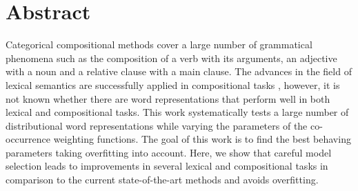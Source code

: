 \chapter*{Abstract}
\label{cha:abstract}

Categorical compositional methods \cite{DBLP:journals/corr/abs-1003-4394} cover a large number of grammatical phenomena such as the composition of a verb with its arguments, an adjective with a noun and a relative clause with a main clause. The advances in the field of lexical semantics \cite{mikolov2013efficient,baroni-dinu-kruszewski:2014:P14-1,TACL570} are successfully applied in compositional tasks \cite{milajevs-EtAl:2014:EMNLP2014}, however, it is not known whether there are word representations that perform well in both lexical and compositional tasks.
%
This work systematically tests a large number of distributional word representations while varying the parameters of the co-occurrence weighting functions.
The goal of this work is to find the best behaving parameters taking overfitting \cite{lapesa2014large} into account.
%
Here, we show that careful model selection leads to improvements in several lexical and compositional tasks in comparison to the current state-of-the-art methods and avoids overfitting.

